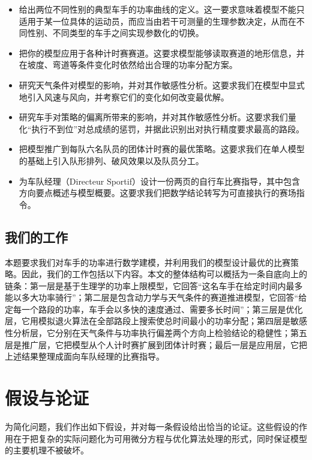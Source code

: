 \documentclass[11pt,a4paper]{ctexart}
\begin{document}
\begin{itemize}
\item 给出两位不同性别的典型车手的功率曲线的定义。这一要求意味着模型不能只适用于某一位具体的运动员，而应当由若干可测量的生理参数决定，从而在不同性别、不同类型的车手之间实现参数化的切换。
\item 把你的模型应用于各种计时赛赛道。这要求模型能够读取赛道的地形信息，并在坡度、弯道等条件变化时依然给出合理的功率分配方案。
\item 研究天气条件对模型的影响，并对其作敏感性分析。这要求我们在模型中显式地引入风速与风向，并考察它们的变化如何改变最优解。
\item 研究车手对策略的偏离所带来的影响，并对其作敏感性分析。这要求我们量化“执行不到位”对总成绩的惩罚，并据此识别出对执行精度要求最高的路段。
\item 把模型推广到每队六名队员的团体计时赛的最优策略。这要求我们在单人模型的基础上引入队形排列、破风效果以及队员分工。
\item 为车队经理（Directeur Sportif）设计一份两页的自行车比赛指导，其中包含方向要点概述与模型概要。这要求我们把数学结论转写为可直接执行的赛场指令。
\end{itemize}

\subsection{我们的工作}

本题要求我们对车手的功率进行数学建模，并利用我们的模型设计最优的比赛策略。因此，我们的工作包括以下内容。本文的整体结构可以概括为一条自底向上的链条：第一层是基于生理学的功率上限模型，它回答“这名车手在给定时间内最多能以多大功率骑行”；第二层是包含动力学与天气条件的赛道推进模型，它回答“给定每一个路段的功率，车手会以多快的速度通过、需要多长时间”；第三层是优化层，它用模拟退火算法在全部路段上搜索使总时间最小的功率分配；第四层是敏感性分析层，它分别在天气条件与功率执行偏差两个方向上检验结论的稳健性；第五层是推广层，它把模型从个人计时赛扩展到团体计时赛；最后一层是应用层，它把上述结果整理成面向车队经理的比赛指导。

\section{假设与论证}

为简化问题，我们作出如下假设，并对每一条假设给出恰当的论证。这些假设的作用在于把复杂的实际问题化为可用微分方程与优化算法处理的形式，同时保证模型的主要机理不被破坏。
\end{document}
